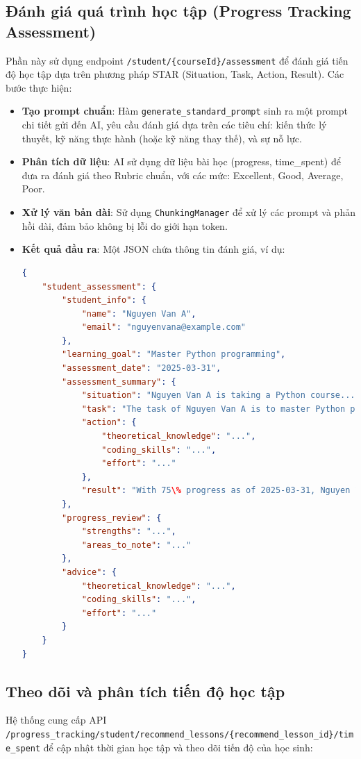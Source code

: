 \subsection{Đánh giá quá trình học tập (Progress Tracking Assessment)}
Phần này sử dụng endpoint \texttt{/student/\{courseId\}/assessment} để đánh giá tiến độ học tập dựa trên phương pháp STAR (Situation, Task, Action, Result). Các bước thực hiện:
\begin{itemize}
    \item \textbf{Tạo prompt chuẩn}: Hàm \texttt{generate\_standard\_prompt} sinh ra một prompt chi tiết gửi đến AI, yêu cầu đánh giá dựa trên các tiêu chí: kiến thức lý thuyết, kỹ năng thực hành (hoặc kỹ năng thay thế), và sự nỗ lực.
    \item \textbf{Phân tích dữ liệu}: AI sử dụng dữ liệu bài học (progress, time\_spent) để đưa ra đánh giá theo Rubric chuẩn, với các mức: Excellent, Good, Average, Poor.
    \item \textbf{Xử lý văn bản dài}: Sử dụng \texttt{ChunkingManager} để xử lý các prompt và phản hồi dài, đảm bảo không bị lỗi do giới hạn token.
    \item \textbf{Kết quả đầu ra}: Một JSON chứa thông tin đánh giá, ví dụ:
    \begin{lstlisting}[language=JSON]
{
    "student_assessment": {
        "student_info": {
            "name": "Nguyen Van A",
            "email": "nguyenvana@example.com"
        },
        "learning_goal": "Master Python programming",
        "assessment_date": "2025-03-31",
        "assessment_summary": {
            "situation": "Nguyen Van A is taking a Python course...",
            "task": "The task of Nguyen Van A is to master Python programming...",
            "action": {
                "theoretical_knowledge": "...",
                "coding_skills": "...",
                "effort": "..."
            },
            "result": "With 75\% progress as of 2025-03-31, Nguyen Van A is on track..."
        },
        "progress_review": {
            "strengths": "...",
            "areas_to_note": "..."
        },
        "advice": {
            "theoretical_knowledge": "...",
            "coding_skills": "...",
            "effort": "..."
        }
    }
}
    \end{lstlisting}
\end{itemize}

\subsection{Theo dõi và phân tích tiến độ học tập}
Hệ thống cung cấp API \texttt{/progress\_tracking/student/recommend\_lessons/\{recommend\_lesson\_id\}/time\_spent} để cập nhật thời gian học tập và theo dõi tiến độ của học sinh:

